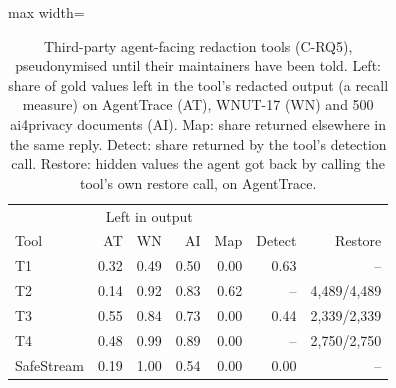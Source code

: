 \begin{table}[t]
\caption{Third-party agent-facing redaction tools (C-RQ5), pseudonymised until their maintainers have been told. Left: share of gold values left in the tool's redacted output (a recall measure) on AgentTrace (AT), WNUT-17 (WN) and 500 ai4privacy documents (AI). Map: share returned elsewhere in the same reply. Detect: share returned by the tool's detection call. Restore: hidden values the agent got back by calling the tool's own restore call, on AgentTrace.}\label{tab:thirdparty}
\centering\footnotesize\setlength{\tabcolsep}{3pt}
\begin{adjustbox}{max width=\columnwidth}\begin{tabular}{@{}l rrr rr r@{}}
\toprule
 & \multicolumn{3}{c}{Left in output} & & & \\
Tool & AT & WN & AI & Map & Detect & Restore \\
\midrule
T1 & 0.32 & 0.49 & 0.50 & 0.00 & 0.63 & -- \\
T2 & 0.14 & 0.92 & 0.83 & 0.62 & -- & 4,489/4,489 \\
T3 & 0.55 & 0.84 & 0.73 & 0.00 & 0.44 & 2,339/2,339 \\
T4 & 0.48 & 0.99 & 0.89 & 0.00 & -- & 2,750/2,750 \\
SafeStream & 0.19 & 1.00 & 0.54 & 0.00 & 0.00 & -- \\
\bottomrule
\end{tabular}\end{adjustbox}
\end{table}
